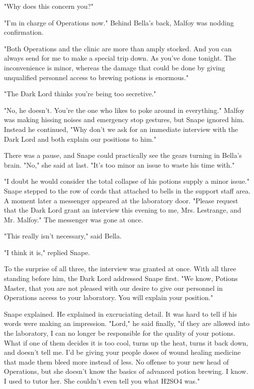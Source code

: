 "Why does this concern you?"

"I'm in charge of Operations now." Behind Bella's back, Malfoy was nodding confirmation.

"Both Operations and the clinic are more than amply stocked. And you can always send for me to make a special trip down. As you've done tonight. The inconvenience is minor, whereas the damage that could be done by giving unqualified personnel access to brewing potions is enormous."

"The Dark Lord thinks you're being too secretive."

"No, he doesn't. You're the one who likes to poke around in everything." Malfoy was making hissing noises and emergency stop gestures, but Snape ignored him. Instead he continued, "Why don't we ask for an immediate interview with the Dark Lord and both explain our positions to him."

There was a pause, and Snape could practically see the gears turning in Bella's brain. "No," she said at last. "It's too minor an issue to waste his time with."

"I doubt he would consider the total collapse of his potions supply a minor issue." Snape stepped to the row of cords that attached to bells in the support staff area. A moment later a messenger appeared at the laboratory door. "Please request that the Dark Lord grant an interview this evening to me, Mrs. Lestrange, and Mr. Malfoy." The messenger was gone at once.

"This really isn't necessary," said Bella.

"I think it is," replied Snape.

To the surprise of all three, the interview was granted at once. With all three standing before him, the Dark Lord addressed Snape first. "We know, Potions Master, that you are not pleased with our desire to give our personnel in Operations access to your laboratory. You will explain your position."

Snape explained. He explained in excruciating detail. It was hard to tell if his words were making an impression. "Lord," he said finally, "if they are allowed into the laboratory, I can no longer be responsible for the quality of your potions. What if one of them decides it is too cool, turns up the heat, turns it back down, and doesn't tell me. I'd be giving your people doses of wound healing medicine that made them bleed more instead of less. No offense to your new head of Operations, but she doesn't know the basics of advanced potion brewing. I know. I used to tutor her. She couldn't even tell you what H2SO4 was."

